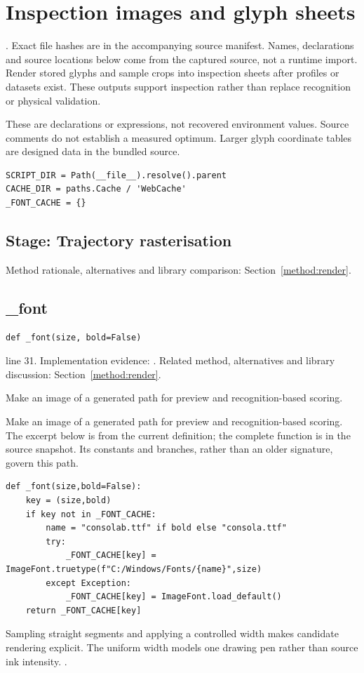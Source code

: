 \chapter{Inspection images and glyph sheets}\label{module:web-render}
. Exact file hashes are in the accompanying source manifest. Names, declarations and source locations below come from the captured source, not a runtime import.
Render stored glyphs and sample crops into inspection sheets after profiles or datasets exist. These outputs support inspection rather than replace recognition or physical validation.


These are declarations or expressions, not recovered environment values. Source comments do not establish a measured optimum. Larger glyph coordinate tables are designed data in the bundled source.
\begin{lstlisting}[style=plain]
SCRIPT_DIR = Path(__file__).resolve().parent
CACHE_DIR = paths.Cache / 'WebCache'
_FONT_CACHE = {}
\end{lstlisting}
\section*{Stage: Trajectory rasterisation}
Method rationale, alternatives and library comparison: Section~\ref{method:render}.
\section{\_font}\label{fn:web-render:-font}
\begin{lstlisting}[style=sig]
def _font(size, bold=False)
\end{lstlisting}
 line 31. Implementation evidence: \cite{code2026}. Related method, alternatives and library discussion: Section~\ref{method:render}.


Make an image of a generated path for preview and recognition-based scoring.


Make an image of a generated path for preview and recognition-based scoring. The excerpt below is from the current definition; the complete function is in the source snapshot. Its constants and branches, rather than an older signature, govern this path.


\begin{lstlisting}[style=plain]
def _font(size,bold=False):
    key = (size,bold)
    if key not in _FONT_CACHE:
        name = "consolab.ttf" if bold else "consola.ttf"
        try:
            _FONT_CACHE[key] = ImageFont.truetype(f"C:/Windows/Fonts/{name}",size)
        except Exception:
            _FONT_CACHE[key] = ImageFont.load_default()
    return _FONT_CACHE[key]
\end{lstlisting}
Sampling straight segments and applying a controlled width makes candidate rendering explicit. The uniform width models one drawing pen rather than source ink intensity. \cite{pillowdraw,opencvdraw,code2026}.


